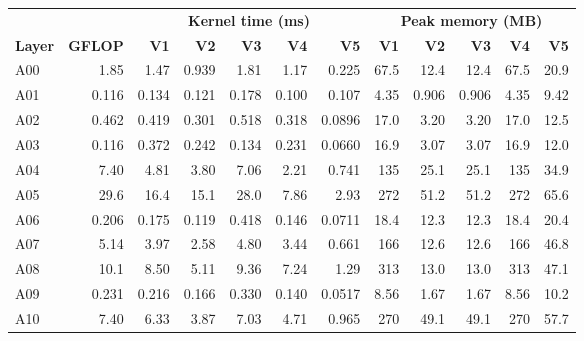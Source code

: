 \begin{tabular}{lrrrrrrrrrrr}
\hline
\rowcolor{headgrey}
& & \multicolumn{5}{c}{\textbf{Kernel time (ms)}} & \multicolumn{5}{c}{\textbf{Peak memory (MB)}} \\
\rowcolor{headgrey}
\textbf{Layer} & \textbf{GFLOP} & \textbf{V1} & \textbf{V2} & \textbf{V3} & \textbf{V4} & \textbf{V5} & \textbf{V1} & \textbf{V2} & \textbf{V3} & \textbf{V4} & \textbf{V5} \\ \hline
A00 & 1.85 & 1.47 & 0.939 & 1.81 & 1.17 & 0.225 & 67.5 & 12.4 & 12.4 & 67.5 & 20.9 \\
A01 & 0.116 & 0.134 & 0.121 & 0.178 & 0.100 & 0.107 & 4.35 & 0.906 & 0.906 & 4.35 & 9.42 \\
A02 & 0.462 & 0.419 & 0.301 & 0.518 & 0.318 & 0.0896 & 17.0 & 3.20 & 3.20 & 17.0 & 12.5 \\
A03 & 0.116 & 0.372 & 0.242 & 0.134 & 0.231 & 0.0660 & 16.9 & 3.07 & 3.07 & 16.9 & 12.0 \\
A04 & 7.40 & 4.81 & 3.80 & 7.06 & 2.21 & 0.741 & 135 & 25.1 & 25.1 & 135 & 34.9 \\
A05 & 29.6 & 16.4 & 15.1 & 28.0 & 7.86 & 2.93 & 272 & 51.2 & 51.2 & 272 & 65.6 \\
A06 & 0.206 & 0.175 & 0.119 & 0.418 & 0.146 & 0.0711 & 18.4 & 12.3 & 12.3 & 18.4 & 20.4 \\
A07 & 5.14 & 3.97 & 2.58 & 4.80 & 3.44 & 0.661 & 166 & 12.6 & 12.6 & 166 & 46.8 \\
A08 & 10.1 & 8.50 & 5.11 & 9.36 & 7.24 & 1.29 & 313 & 13.0 & 13.0 & 313 & 47.1 \\
A09 & 0.231 & 0.216 & 0.166 & 0.330 & 0.140 & 0.0517 & 8.56 & 1.67 & 1.67 & 8.56 & 10.2 \\
A10 & 7.40 & 6.33 & 3.87 & 7.03 & 4.71 & 0.965 & 270 & 49.1 & 49.1 & 270 & 57.7 \\
\hline
\end{tabular}
